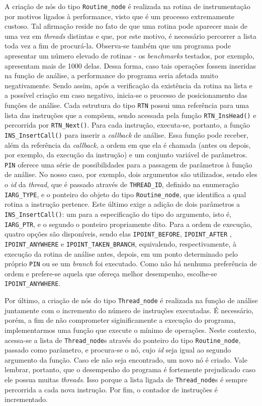 \documentclass[12pt]{article}
\begin{document}
A criação de nós do tipo \texttt{Routine\_node} é realizada na rotina de
instrumentação por motivos ligados à performance, visto que é um processo
extremamente custoso. Tal afirmação reside no fato de que uma rotina
pode aparecer mais de uma vez em \textit{threads} distintas e que, por este
motivo, é necessário percorrer a lista toda vez a fim de procurá-la. Observa-se
também que um programa pode apresentar um número elevado de rotinas - os
\textit{benchmarks} testados, por exemplo, apresentam mais de 1000 delas. Dessa
forma, caso tais operações fossem inseridas na função de análise, a performance
do programa seria afetada muito negativamente. Sendo assim, após a verificação
da existência da rotina na lista e a possível criação em caso negativo,
inicia-se o processo de posicionamento das funções de análise. Cada estrutura do
tipo \texttt{RTN} possui uma referência para uma lista das instruções que a
compõem, sendo acessada pela função \texttt{RTN\_InsHead()} e percorrida por
\texttt{RTN\_Next()}. Para cada instrução, executa-se, portanto, a função
\texttt{INS\_InsertCall()} para inserir a \textit{callback} de análise. Essa
função pode receber, além da referência da \textit{callback}, a ordem em que
ela é chamada (antes ou depois, por exemplo, da execução da instrução) e um
conjunto variável de parâmetros. \texttt{PIN} oferece uma série de
possibilidades para a passagem de parâmetros à função de análise. No nosso caso,
por exemplo, dois argumentos são utilizados, sendo eles o \textit{id} da
\textit{thread}, que é passado através de \texttt{THREAD\_ID}, definido na
enumeração \texttt{IARG\_TYPE}, e o ponteiro do objeto do tipo
\texttt{Routine\_node}, que identifica a qual rotina a instrução pertence. Este
último exige a adição de dois parâmetros a \texttt{INS\_InsertCall()}: um para a
especificação do tipo do argumento, isto é, \texttt{IARG\_PTR}, e o segundo o
ponteiro propriamente dito. Para a ordem de execução, quatro opções são
disponíveis, sendo elas \texttt{IPOINT\_BEFORE}, \texttt{IPOINT\_AFTER} ,
\texttt{IPOINT\_ANYWHERE} e \texttt{IPOINT\_TAKEN\_BRANCH}, equivalendo,
respectivamente, à execução da rotina de análise antes, depois, em um ponto
determinado pelo próprio \texttt{PIN} ou se um \textit{branch} foi executado.
Como não há nenhuma preferência de ordem e prefere-se aquela que ofereça melhor
desempenho, escolhe-se \texttt{IPOINT\_ANYWHERE}.

Por último, a criação de nós do tipo \texttt{Thread\_node} é realizada na função
de análise juntamente com o incremento do número de instruções executadas. É 
necessário, porém, a fim de não comprometer siginificamente a execução do
programa, implementarmos uma função que execute o mínimo de operações. Neste
contexto, acessa-se a lista de \texttt{Thread\_node}s através do ponteiro do
tipo \texttt{Routine\_node}, passado como parâmetro, e procura-se o nó, cujo
\textit{id} seja igual ao segundo argumento da função. Caso ele não seja
encontrado, um novo nó é criado. Vale lembrar, portanto, que o desempenho do
programa é fortemente prejudicado caso ele possua muitas \textit{threads}. Isso
porque a lista ligada de \texttt{Thread\_node}s é sempre percorrida a cada nova
instrução. Por fim, o contador de instruções é incrementado.
\end{document}
